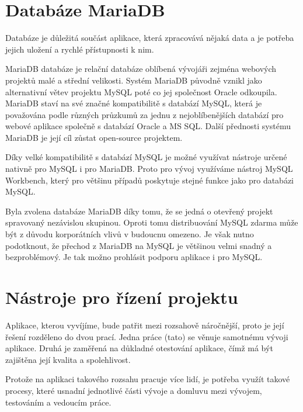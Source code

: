 \documentclass[czech,BP]{thesiskiv}
\begin{document}
\section{Databáze MariaDB}
	\par Databáze je důležitá součást aplikace, která zpracovává nějaká data a je potřeba jejich uložení a rychlé přístupnosti k nim.
	\par MariaDB databáze je relační databáze oblíbená vývojáři zejména webových projektů malé a střední velikosti. Systém MariaDB původně vznikl jako alternativní větev projektu MySQL poté co jej společnost Oracle odkoupila. MariaDB staví na své značné kompatibilitě s databází MySQL, která je považována podle různých průzkumů za jednu z nejoblíbenějších databází pro webové aplikace společně s databází Oracle a MS SQL. Další přednosti systému MariaDB je její cíl zůstat open-source projektem.
	\par Díky velké kompatibilitě s databází MySQL je možné využívat nástroje určené nativně pro MySQL i pro MariaDB. Proto pro vývoj využíváme nástroj MySQL Workbench, který pro většinu případů poskytuje stejné funkce jako pro databázi MySQL.
	\par Byla zvolena databáze MariaDB díky tomu, že se jedná o otevřený projekt spravovaný nezávislou skupinou. Oproti tomu distribuování MySQL zdarma může být z důvodu korporátních vlivů v budoucnu omezeno. Je však nutno podotknout, že přechod z MariaDB na MySQL je většinou velmi snadný a bezproblémový. Je tak možno prohlásit podporu aplikace i pro MySQL.
\section{Nástroje pro řízení projektu}
	\par Aplikace, kterou vyvíjíme, bude patřit mezi rozsahově náročnější, proto je její řešení rozděleno do dvou prací. Jedna práce (tato) se věnuje samotnému vývoji aplikace. Druhá je zaměřená na důkladné otestování aplikace, čímž má být zajištěna její kvalita a spolehlivost.
	\par Protože na aplikaci takového rozsahu pracuje více lidí, je potřeba využít takové procesy, které usnadní jednotlivé části vývoje a domluvu mezi vývojem, testováním a vedoucím práce.
\end{document}
